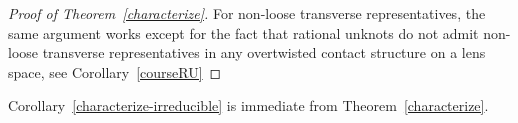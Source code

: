 \documentclass[11pt]{amsart}
\theoremstyle{plain}
\theoremstyle{definition}
\theoremstyle{remark}
\numberwithin{theorem}{section}
\begin{document}
\begin{proof}[Proof of Theorem~\ref{characterize}]
  For non-loose transverse representatives, the same argument works except for the fact that rational unknots do not admit non-loose transverse representatives in any overtwisted contact structure on a lens space, see Corollary~\ref{courseRU}
\end{proof}

Corollary~\ref{characterize-irreducible} is immediate from Theorem~\ref{characterize}.

\end{document}
